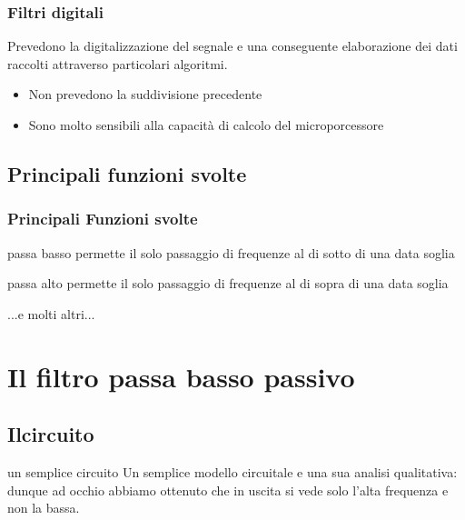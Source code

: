 		\begin{frame}[c]\frametitle{Filtri digitali}

			Prevedono la digitalizzazione del segnale e una conseguente elaborazione dei dati raccolti attraverso particolari algoritmi.
			\begin{itemize}
				\pause
				\item Non prevedono la suddivisione precedente
				\pause
				\item Sono molto sensibili alla capacità di calcolo del microporcessore
			\end{itemize}

		\end{frame}
		

		\subsection{Principali funzioni svolte} %
		\label{sub:principali_funzioni_svolte}

		\begin{frame}[c]\frametitle{Principali Funzioni svolte}	
		\begin{block}{passa basso}
		    	permette il solo passaggio di frequenze al di sotto di una data soglia
		\end{block}
		\pause
		\begin{block}{passa alto}
				permette il solo passaggio di frequenze al di sopra di una data soglia 
		\end{block}
		\pause
		\begin{center}
		...e molti altri...
		\end{center}
		
		\end{frame}


	\section{Il filtro passa basso passivo} %
	\label{sec:il_filtro_passa_basso}

		\subsection{Ilcircuito} %
		\label{sub:un_semplice_circuito}
		\begin{frame}[c]{un semplice circuito}
			Un semplice modello circuitale e una sua analisi qualitativa:\\
			\pause
			dunque ad occhio abbiamo ottenuto che in uscita si vede solo l'alta frequenza e non la bassa.
		\end{frame}
	
